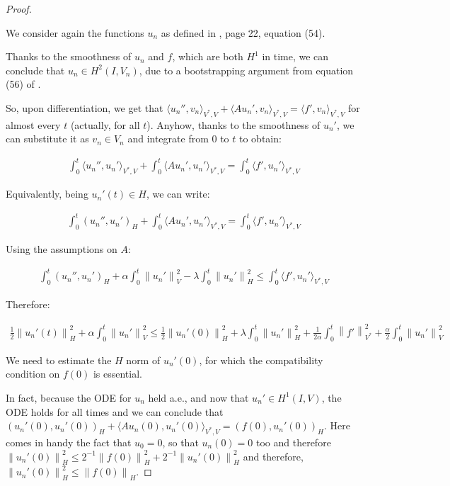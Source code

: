 \documentclass[english,a4paper,12pt,oneside]{scrbook}
\theoremstyle{break}
\newenvironment{mproof}[1][\proofname]{%
  \begin{proof}[#1]$ $\par\nobreak\ignorespaces
}{%
  \end{proof}
}
\renewcommand*{\proofname}{Proof}
\theoremstyle{remark}
\newcommand{\norm}[1]{\left\lVert#1\right\rVert}
\newcommand{\HN}[1]{\norm{#1}_{H}}
\newcommand{\VN}[1]{\norm{#1}_{V}}
\newcommand{\VSN}[1]{\norm{#1}_{V^*}}
\begin{document}
\begin{mproof}

We consider again the functions $u_n$ as defined in \cite{gilardi}, page 22, equation (54).

Thanks to the smoothness of $u_n$ and $f$, which are both $H^1$ in time, we can conclude that $u_n \in H^2(I,V_n)$, due to a bootstrapping argument from equation (56) of \cite{gilardi}.

So, upon differentiation, we get that $\langle u_n'', v_n\rangle_{V^*,V} + \langle A u_n', v_n\rangle_{V^*,V} = \langle f', v_n \rangle_{V^*,V}$ for almost every $t$ (actually, for all $t$). Anyhow, thanks to the smoothness of $u_n'$, we can substitute it as $v_n \in V_n$ and integrate from $0$ to $t$ to obtain:

\begin{align*}
\int_0^t \langle u_n'', u_n'\rangle_{V^*,V} + \int_0^t\langle A u_n',u_n'\rangle_{V^*,V} = \int_0^t \langle f', u_n' \rangle_{V^*,V}
\end{align*}

Equivalently, being $u_n'(t) \in H$, we can write:

\begin{align*}
\int_0^t (u_n'', u_n')_H + \int_0^t\langle A u_n',u_n'\rangle_{V^*,V} = \int_0^t \langle f', u_n' \rangle_{V^*,V}
\end{align*}

Using the assumptions on $A$:

\begin{align*}
\int_0^t (u_n'', u_n')_H + \alpha \int_0^t \VN{u_n'}^2 - \lambda \int_0^t \HN{u_n'}^2 \leq \int_0^t \langle f', u_n' \rangle_{V^*,V}
\end{align*}

Therefore:

\begin{align*}
\frac{1}{2} \HN{u_n'(t)}^2 + \alpha \int_0^t \VN{u_n'}^2 \leq \frac{1}{2} \HN{u_n'(0)}^2+ \lambda \int_0^t \HN{u_n'}^2 +\frac{1}{2\alpha} \int_0^t \VSN{ f'}^2+ \frac{\alpha}{2}\int_0^t \VN{u_n'}^2
\end{align*}

We need to estimate the $H$ norm of $u_n'(0)$, for which the compatibility condition on $f(0)$ is essential.

In fact, because the ODE for $u_n$ held a.e., and now that $u_n' \in H^1(I,V)$, the ODE holds for all times and we can conclude that $(u_n'(0),u_n'(0))_H + \langle A u_n(0), u_n'(0)\rangle_{V^*,V} = ( f(0), u_n'(0))_H$. Here comes in handy the fact that $u_0=0$, so that $u_n(0)=0$ too and therefore $\HN{u_n'(0)}^2  \leq 2^{-1}\HN{f(0)}^2 + 2^{-1} \HN{u_n'(0)}^2$ and therefore, $\HN{u_n'(0)}^2\leq \HN{f(0)}$.


\end{mproof}
\end{document}
